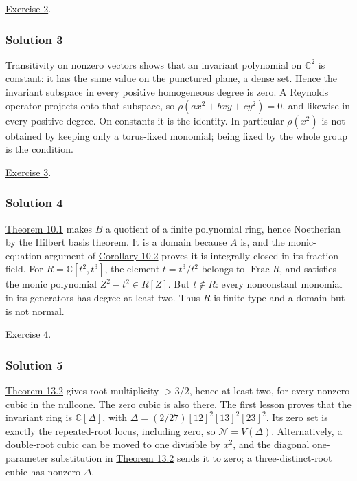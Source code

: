 \documentclass[
]{article}
\begin{document}
\hyperref[exercise-2]{Exercise 2}.

\subsubsection{Solution 3}\label{solution-3}

Transitivity on nonzero vectors shows that an invariant polynomial on
\(\mathbb C^2\) is constant: it has the same value on the punctured
plane, a dense set. Hence the invariant subspace in every positive
homogeneous degree is zero. A Reynolds operator projects onto that
subspace, so \(\rho(ax^2+bxy+cy^2)=0\), and likewise in every positive
degree. On constants it is the identity. In particular \(\rho(x^2)\) is
not obtained by keeping only a torus-fixed monomial; being fixed by the
whole group is the condition.

\hyperref[exercise-3]{Exercise 3}.

\subsubsection{Solution 4}\label{solution-4}

\href{NOE-INV-01.html\#theorem-10-1}{Theorem 10.1} makes \(B\) a
quotient of a finite polynomial ring, hence Noetherian by the Hilbert
basis theorem. It is a domain because \(A\) is, and the monic-equation
argument of \href{NOE-INV-01.html\#corollary-10-2}{Corollary 10.2}
proves it is integrally closed in its fraction field. For
\(R=\mathbb C [t^2,t^3]\), the element \(t=t^3/t^2\) belongs to
\(\operatorname{Frac}R\), and satisfies the monic polynomial
\(Z^2-t^2\in R [Z]\). But \(t\notin R\): every nonconstant monomial in
its generators has degree at least two. Thus \(R\) is finite type and a
domain but is not normal.

\hyperref[exercise-4]{Exercise 4}.

\subsubsection{Solution 5}\label{solution-5}

\href{NOE-INV-01.html\#theorem-13-2}{Theorem 13.2} gives root
multiplicity \(>3/2\), hence at least two, for every nonzero cubic in
the nullcone. The zero cubic is also there. The first lesson proves that
the invariant ring is \(\mathbb C [\Delta]\), with
\(\Delta=(2/27)[12]^2 [13]^2 [23]^2\). Its zero set is exactly the
repeated-root locus, including zero, so \(\mathcal N=V(\Delta)\).
Alternatively, a double-root cubic can be moved to one divisible by
\(x^2\), and the diagonal one-parameter substitution in
\href{NOE-INV-01.html\#theorem-13-2}{Theorem 13.2} sends it to zero; a
three-distinct-root cubic has nonzero \(\Delta\).
\end{document}
